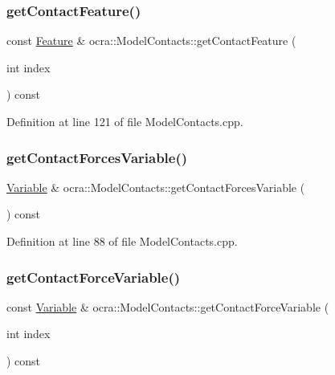 \subsubsection{\texorpdfstring{get\+Contact\+Feature()}{getContactFeature()}}
{\footnotesize\ttfamily const \hyperlink{classocra_1_1Feature}{Feature} \& ocra\+::\+Model\+Contacts\+::get\+Contact\+Feature (\begin{DoxyParamCaption}\item[{int}]{index }\end{DoxyParamCaption}) const}



Definition at line 121 of file Model\+Contacts.\+cpp.

\hypertarget{classocra_1_1ModelContacts_a6668bfd6c112b849536b701cd2d1097c}{}\label{classocra_1_1ModelContacts_a6668bfd6c112b849536b701cd2d1097c} 
\subsubsection{\texorpdfstring{get\+Contact\+Forces\+Variable()}{getContactForcesVariable()}}
{\footnotesize\ttfamily \hyperlink{classocra_1_1Variable}{Variable} \& ocra\+::\+Model\+Contacts\+::get\+Contact\+Forces\+Variable (\begin{DoxyParamCaption}{ }\end{DoxyParamCaption}) const}



Definition at line 88 of file Model\+Contacts.\+cpp.

\hypertarget{classocra_1_1ModelContacts_aede709082b66b0c30aa57ac4cd7094ad}{}\label{classocra_1_1ModelContacts_aede709082b66b0c30aa57ac4cd7094ad} 
\subsubsection{\texorpdfstring{get\+Contact\+Force\+Variable()}{getContactForceVariable()}}
{\footnotesize\ttfamily const \hyperlink{classocra_1_1Variable}{Variable} \& ocra\+::\+Model\+Contacts\+::get\+Contact\+Force\+Variable (\begin{DoxyParamCaption}\item[{int}]{index }\end{DoxyParamCaption}) const}



